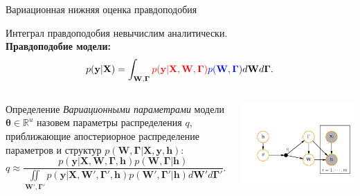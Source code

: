 \documentclass[usenames,dvipsnames,11pt,pdf,utf8,russian,aspectratio=43]{beamer}
\begin{document}
\begin{frame}{Вариационная нижняя оценка правдоподобия} 
\footnotesize

Интеграл правдоподобия невычислим аналитически.\\
\textbf{Правдоподобие модели:}
\[
p(\mathbf{y}|\mathbf{X}) =
 \int_{\mathbf{W}, \boldsymbol{\Gamma} } \textcolor{red}{p(\mathbf{y}|\mathbf{X},\mathbf{W},  \boldsymbol{\Gamma})} \textcolor{blue}{p(\mathbf{W}, \boldsymbol{\Gamma})}d\mathbf{W}d{\boldsymbol{\Gamma}}.                         
\]

\begin{columns}
\begin{column}{0.6\textwidth}
  
\begin{block}{Определение}
\textit{Вариационными параметрами} модели $\boldsymbol{\theta} \in \mathbb{R}^{{u}}$ назовем параметры распределения $q$, приближающие апостериорное распределение параметров и структур $p(\mathbf{W}, \boldsymbol{\Gamma}|\mathbf{X}, \mathbf{y}, \mathbf{h})$:
\[
    q \approx  \frac{p(\mathbf{y}|\mathbf{X},\mathbf{W},\boldsymbol{\Gamma}, \mathbf{h})p(\mathbf{W}, \boldsymbol{\Gamma}|\mathbf{h})}{\iint\limits_{\mathbf{W}', \boldsymbol{\Gamma'}}p(\mathbf{y}|\mathbf{X},\mathbf{W}',\boldsymbol{\Gamma}', \mathbf{h})p(\mathbf{W}', \boldsymbol{\Gamma}'|\mathbf{h})d\mathbf{W}'d\boldsymbol{\Gamma}'}.
\]
\end{block} 

\end{column}
\begin{column}{0.4\textwidth}  %
    \begin{center}
     \includegraphics[width=\textwidth]{plate.pdf}
     \end{center}
\end{column}
\end{columns}




\end{frame}
\end{document}
